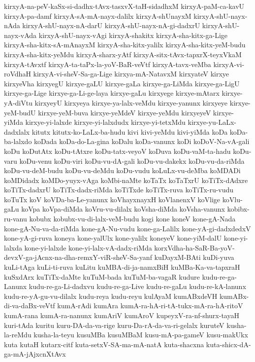 {kirxyA-na-peV-kaSx-si-dadhx-tAvx-tasxvX-taH-sidadhxM
kirxyA-paM-ca-kavU
kirxyA-pa-damf
kirxyA-sA-mA-nayx-dalilx
kirxyA-shUnayxM
kirxyA-shU-nayx-nAda
kirxyA-shU-nayx-nA-darU
kirxyA-shU-nayx-nA-gi-dadxrU
kirxyA-shU-nayx-vAda
kirxyA-shU-nayx-vAgi
kirxyA-shakitx
kirxyA-sha-kitx-ga-Lige
kirxyA-sha-kitx-sA-mAnayxM
kirxyA-sha-kitx-yalilx
kirxyA-sha-kitx-yeM-budu
kirxyA-sha-kitx-yeMdu
kirxyA-sharx-yAtf
kirxyA-sitx-tAvx-tapxrX-teyxVkaM
kirxyA-tAvxtf
kirxyA-ta-taPx-la-yoV-BaR-veVtf
kirxyA-tavx-veMba
kirxyA-vi-roVdhaH
kirxyA-vi-sheV-Sa-ga-Lige
kirxya-mA-NatavxM
kirxyateV
kirxye
kirxyeVha
kirxyegU
kirxye-gaLU
kirxye-gaLa
kirxye-ga-LiMda
kirxye-ga-LigU
kirxye-ga-Lige
kirxye-ga-Li-ge-laya
kirxye-gaLu
kirxyege
kirxye-mAtarx
kirxye-yA-diVtu
kirxyeyU
kirxyeya
kirxye-ya-lalx-veMdu
kirxye-yanunx
kirxyeye
kirxye-yeM-budU
kirxye-yeM-buva
kirxye-yeMdeV
kirxye-yeMdu
kirxyeyeV
kirxye-yiMda
kirxye-yi-lalxde
kirxye-yi-lalxdudx
kirxye-yi-tetxMdu
kirxye-yu-LaLx-dadxlalx
kitutx
kitutx-ko-LaLx-ba-hudu
kivi
kivi-yeMdu
kivi-yiMda
koDa
koDa-ba-lalxdo
koDada
koDa-do-La-gina
koDalu
koDa-vanunx
koDi
koDoV-Na-vA-gali
koDu
koDutAtx
koDu-tAtxre
koDu-tatx-veyoV
koDuva
koDu-vaM-ta-hadu
koDu-varu
koDu-venu
koDu-viri
koDu-vu-dA-gali
koDu-vu-dakekx
koDu-vu-da-riMda
koDu-vu-deM-budu
koDu-vu-deMdu
koDu-vudu
koLuLx-vu-deMba
koMDADi
koMDidadx
koMDo-yuyx-vAga
koMbi-naMte
koTaTx
koTaTxrU
koTiTx-dAdxre
koTiTx-dadxrU
koTiTx-dadx-riMda
koTiTxde
koTiTx-ruva
koTiTx-ru-vudu
koTuTx
koV
koVDa-ba-Le-yanunx
koVhayxnayxH
koVlanenxV
koVlige
koVlu-gaLu
koVpa
koVpa-diMda
koVru-vu-dilalx
koVsha-diMda
koVsha-vanunx
kobibx-ru-vanu
kobubx
kobubx-vu-di-lalx-veM-budu
kogi
kone
koneV
kone-gA-Nada
kone-gA-Nu-va-da-riMda
kone-gA-Nu-vudu
kone-ga-Lalilx
kone-yA-gi-dadxdedxV
kone-yA-gi-ruva
koneya
kone-yalUlx
kone-yalilx
koneyeV
kone-yiM-dalU
kone-yi-lalxda
kone-yi-lalxde
kone-yi-lalx-vA-dadx-riMda
korxVdha-ha-SaR-Ba-yoV-devxV-ga-jAcnx-na-dha-remxY-viR-sheV-Sa-yanf
kuDayxM-BAti
kuDi-yuva
kuLi-tAga
kuLi-ti-ruva
kuLitu
kuMBA-di-ja-namxBiH
kuMBa-Ka-va-tapxraH
kuSxdArx
kuTiTx-daMte
kuTuM-bada
kuTuM-ba-vagaR
kudure
kudu-re-ga-Lanunx
kudu-re-ga-Li-dadxvu
kudu-re-ga-Live
kudu-re-gaLu
kudu-re-kA-lanunx
kudu-re-yA-gu-vu-dilalx
kudu-reya
kudu-reyu
kulAyaM
kumABxdeVH
kumABx-di-va-daBx-veVtf
kumA-rAdi
kumAra
kumA-ra-hA-ri-tA-tukx-mA-ra-hA-ritoV
kumA-rana
kumA-ra-nanunx
kumAriV
kumAroV
kupeyxV-ra-nf-shurx-tayaH
kuri-tAda
kuritu
kuru-DA-da-va-rige
kuru-Da-rA-da-va-ri-gelalx
kuruteV
kusha-la-reMdu
kusha-la-teyu
kusuMBa
kusuMBaM
kusu-mA-pa-gameV
kusu-makUkx
kuta
kutaH
kutarx-citf
kuta-setxV-SA-ma-mA-natA
kuta-shacxna
kuta-shicx-dA-ga-mA-jAjxcnXtAvx
}
